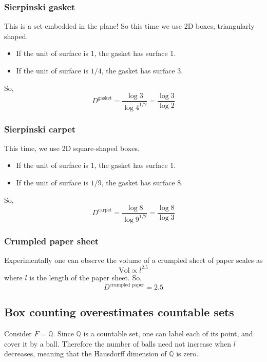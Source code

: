 \documentclass[11pt]{article}
\begin{document}
\subsubsection{Sierpinski gasket}
This is a set embedded in the plane! So this time we use 2D boxes, triangularly shaped.
\begin{itemize}
	\item If the unit of surface is 1, the gasket has surface 1.
	\item If the unit of surface is $1/4$, the gasket has surface 3.
\end{itemize}
So, 
\begin{equation}
	D^{\text{gasket}} = \frac{\log 3}{\log 4^{1/2}} = \frac{\log 3}{\log 2}
\end{equation}

\subsubsection{Sierpinski carpet}
This time, we use 2D square-shaped boxes.
\begin{itemize}
	\item If the unit of surface is 1, the gasket has surface 1.
	\item If the unit of surface is $1/9$, the gasket has surface 8.
\end{itemize}
So, 
\begin{equation}
	D^{\text{carpet}} = \frac{\log 8}{\log 9^{1/2}} = \frac{\log 8}{\log 3}
\end{equation}

\subsubsection{Crumpled paper sheet}
Experimentally one can observe the volume of a crumpled sheet of paper scales as
\begin{equation}
	\text{Vol} \propto l^{2.5}
\end{equation}
where $l$ is the length of the paper sheet. So,
\begin{equation}
	D^{\text{crumpled paper}} = 2.5
\end{equation}

\subsection{Box counting overestimates countable sets}
Consider $F = \mathbb{Q}$. Since $\mathbb{Q}$ is a countable set, one can label each of its point, and cover it by a ball. Therefore the number of balls need not increase when $l$ decreases, meaning that the Hausdorff dimension of $\mathbb{Q}$ is zero.
\end{document}
